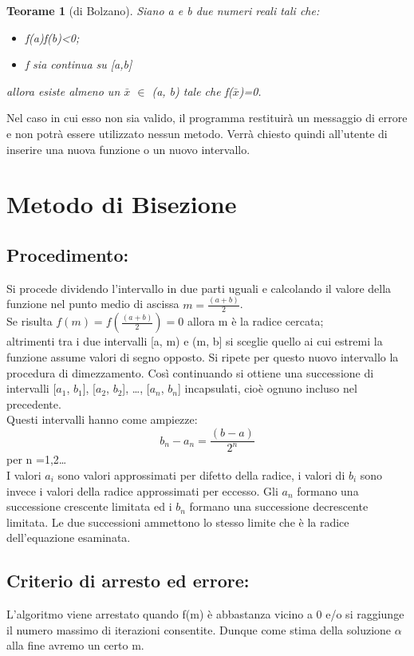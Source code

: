 \documentclass[a4paper,12pt,]{article}
\begin{document}
\newtheorem{Teorema}{Teorame}
\begin{Teorema}[di Bolzano]
Siano a e b due numeri reali tali che:
\begin{itemize}
\item  f(a)f(b)<0;
\item  f sia continua su [a,b]
\end{itemize}	
allora esiste almeno un $\bar{x}$ $\in$  (a, b) tale che f($\bar{x}$)=0.
\end{Teorema}
Nel caso in cui esso non sia valido, il programma restituirà un messaggio di errore e non potrà essere utilizzato nessun metodo.
Verrà chiesto quindi all'utente di inserire una nuova funzione o un nuovo intervallo.

\section{Metodo di Bisezione}
\subsection{Procedimento:}
Si procede dividendo l'intervallo in due parti uguali e calcolando il valore della funzione nel punto medio di ascissa   $m = \frac{(a+b)}{2}$.
\\
Se risulta  $f(m) =f (\frac{(a+b)}{2}) = 0$   allora m è la radice cercata; 
\\
altrimenti tra i due intervalli [a, m) e (m, b] si sceglie quello ai cui estremi la funzione  assume  valori di segno opposto. 
Si ripete per questo  nuovo intervallo la procedura di dimezzamento.
Così continuando si ottiene una successione di intervalli [$a_1$, $b_1$], [$a_2$, $b_2$], \dots, [$a_n$, $b_n$] incapsulati,
cioè ognuno incluso nel precedente. 
\\
Questi intervalli hanno come ampiezze:
\begin{equation} b_n- a_n=\frac{(b-a)}{2^n}  \end {equation}per n =1,2\dots
\\
I valori $a_i$ sono valori approssimati per difetto della radice, i valori di $b_i$ sono invece i valori della radice approssimati per eccesso. 
Gli $a_n$ formano una successione crescente limitata ed i $b_n$ formano una successione decrescente limitata.
Le due successioni ammettono lo stesso limite che è la radice dell'equazione esaminata.
\subsection{Criterio di arresto ed errore:}
L'algoritmo viene arrestato quando f(m) è abbastanza vicino a 0 e/o si raggiunge il numero massimo di iterazioni consentite.
Dunque come stima della soluzione $\alpha$ alla fine avremo un certo m. 
\\
\end{document}
